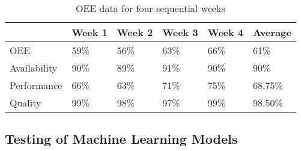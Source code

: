 \documentclass[runningheads]{llncs}
\begin{document}
\begin{table}[]
\label{tab:distance}
\centering
\caption{OEE data for four sequential weeks}
\begin{tabular}{p{2.4cm}p{1.6cm}p{1.6cm}p{1.6cm}p{1.6cm}p{1.6cm}}
\hline
\multicolumn{1}{l}{\textbf{}} &  \textbf{Week 1} & \textbf{Week 2} & \textbf{Week 3}& \textbf{Week 4} & \textbf{Average} \\ \hline
OEE             & 59\%& 56\% &  63\% & 66\% & 61\%\\
Availability             & 90\%& 89\% &  91\% & 90\% & 90\%\\
Performance            & 66\%& 63\% &  71\% & 75\% & 68.75\% \\
Quality             & 99\%& 98\% &  97\% & 99\% & 98.50\%\\
\hline
\end{tabular}
\label{tab:dist}
\end{table}


\subsection{Testing of Machine Learning Models}

\iffalse

In this article, we show that logistic regression andartificial neural networks share common roots in sta-tistical pattern recognition, and how the latter modelcan be seen as a generalization of the former. 

We brieflycompare these two methods with other popular classification algorithms from the machine learning field, suchask-nearest neighbors, decision trees, and support vec-tor machines.



ogistic re-gression (LR) and artificial neural networks (ANN).These models have their origins in two different com-munities (statistics and computer science), but sharemany similarities. sta-tistical pattern recognition

This section measures the performance in terms of accuracy, precision and recall (Table~\ref{tab:evaluation}) of the chosen classification technique - logistic regression. Accuracy means that ``how often is the classifier correct?" Thus, the proposed algorithm has an accuracy of 80\%, that is, for each 100 ``machineOn = 1" or ``machineOn = 0" types it classified, 80 were correctly classified. Precision means that ``when the model predicts the positive result ``MachineOn = 1", how often is it correct?"
\fi
\end{document}
